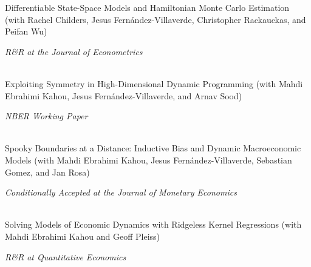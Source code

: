 \documentclass[10pt]{article}
\renewcommand{\section}[2]%
        {\pagebreak[2]\vspace{1.3\baselineskip}%
         \phantomsection\addcontentsline{toc}{section}{#1}%
         \hspace{0in}%
         \marginpar{
         \raggedright \scshape #1}#2}
\newenvironment{innerlist}[1][\enskip\textbullet]%
        {\begin{compactitem}[#1]}{\end{compactitem}}
\newcommand{\blankline}{\quad\pagebreak[2]}
\begin{document}
{Differentiable State-Space Models and Hamiltonian Monte Carlo Estimation} (with Rachel Childers, Jesus Fern\'andez-Villaverde, Christopher Rackauckas, and Peifan Wu)
\begin{innerlist}
        \item[] \textit{R\&R at the Journal of Econometrics}
\end{innerlist}
\ \\
\textit{} {Exploiting Symmetry in High-Dimensional Dynamic Programming} (with Mahdi Ebrahimi Kahou, Jesus  Fern\'andez-Villaverde, and Arnav Sood)
\begin{innerlist}
        \item[] \textit{NBER Working Paper}
\end{innerlist}
\ \\
\textit{} Spooky Boundaries at a Distance: Inductive Bias and Dynamic Macroeconomic Models (with Mahdi Ebrahimi Kahou, Jesus Fern\'andez-Villaverde, Sebastian Gomez, and Jan Rosa)
\begin{innerlist}
        \item[] \textit{Conditionally Accepted at the Journal of Monetary Economics}
\end{innerlist}
\ \\
\textit{} Solving Models of Economic Dynamics with Ridgeless Kernel Regressions (with Mahdi Ebrahimi Kahou and Geoff Pleiss)
\begin{innerlist}
        \item[] \textit{R\&R at Quantitative Economics}
\end{innerlist}
\end{document}
